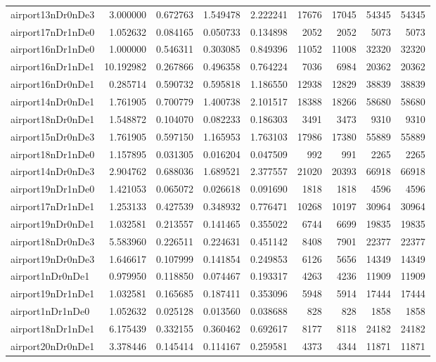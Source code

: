 \begin{longtable}{|l|r|r|r|r|r|r|r|r|}
airport13nDr0nDe3 & 3.000000 & 0.672763 & 1.549478 & 2.222241 & 17676 & 17045 & 54345 & 54345 \\
airport17nDr1nDe0 & 1.052632 & 0.084165 & 0.050733 & 0.134898 & 2052 & 2052 & 5073 & 5073 \\
airport16nDr1nDe0 & 1.000000 & 0.546311 & 0.303085 & 0.849396 & 11052 & 11008 & 32320 & 32320 \\
airport16nDr1nDe1 & 10.192982 & 0.267866 & 0.496358 & 0.764224 & 7036 & 6984 & 20362 & 20362 \\
airport16nDr0nDe1 & 0.285714 & 0.590732 & 0.595818 & 1.186550 & 12938 & 12829 & 38839 & 38839 \\
airport14nDr0nDe1 & 1.761905 & 0.700779 & 1.400738 & 2.101517 & 18388 & 18266 & 58680 & 58680 \\
airport18nDr0nDe1 & 1.548872 & 0.104070 & 0.082233 & 0.186303 & 3491 & 3473 & 9310 & 9310 \\
airport15nDr0nDe3 & 1.761905 & 0.597150 & 1.165953 & 1.763103 & 17986 & 17380 & 55889 & 55889 \\
airport18nDr1nDe0 & 1.157895 & 0.031305 & 0.016204 & 0.047509 & 992 & 991 & 2265 & 2265 \\
airport14nDr0nDe3 & 2.904762 & 0.688036 & 1.689521 & 2.377557 & 21020 & 20393 & 66918 & 66918 \\
airport19nDr1nDe0 & 1.421053 & 0.065072 & 0.026618 & 0.091690 & 1818 & 1818 & 4596 & 4596 \\
airport17nDr1nDe1 & 1.253133 & 0.427539 & 0.348932 & 0.776471 & 10268 & 10197 & 30964 & 30964 \\
airport19nDr0nDe1 & 1.032581 & 0.213557 & 0.141465 & 0.355022 & 6744 & 6699 & 19835 & 19835 \\
airport18nDr0nDe3 & 5.583960 & 0.226511 & 0.224631 & 0.451142 & 8408 & 7901 & 22377 & 22377 \\
airport19nDr0nDe3 & 1.646617 & 0.107999 & 0.141854 & 0.249853 & 6126 & 5656 & 14349 & 14349 \\
airport1nDr0nDe1 & 0.979950 & 0.118850 & 0.074467 & 0.193317 & 4263 & 4236 & 11909 & 11909 \\
airport19nDr1nDe1 & 1.032581 & 0.165685 & 0.187411 & 0.353096 & 5948 & 5914 & 17444 & 17444 \\
airport1nDr1nDe0 & 1.052632 & 0.025128 & 0.013560 & 0.038688 & 828 & 828 & 1858 & 1858 \\
airport18nDr1nDe1 & 6.175439 & 0.332155 & 0.360462 & 0.692617 & 8177 & 8118 & 24182 & 24182 \\
airport20nDr0nDe1 & 3.378446 & 0.145414 & 0.114167 & 0.259581 & 4373 & 4344 & 11871 & 11871 \\

\end{longtable}
